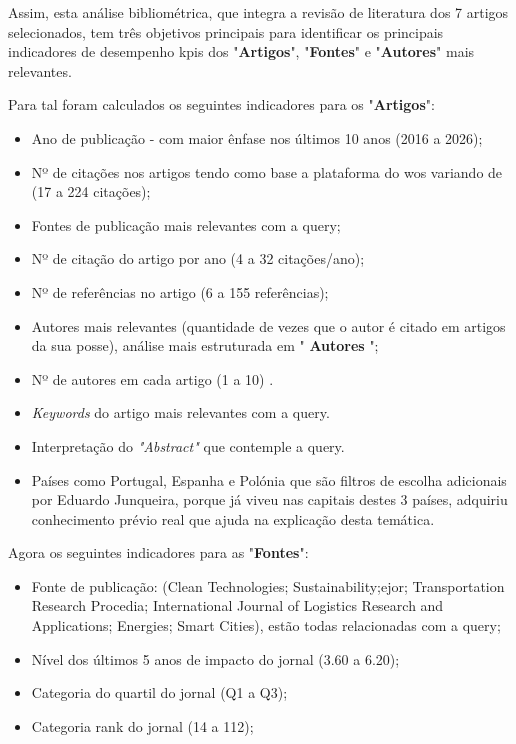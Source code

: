 Assim, esta análise bibliométrica, que integra a revisão de literatura dos 7 artigos selecionados, tem três objetivos principais para identificar os principais indicadores de desempenho \gls{kpi}s dos "\textbf{Artigos}", "\textbf{Fontes}" e "\textbf{Autores}" mais relevantes.

Para tal foram calculados os seguintes indicadores para os "\textbf{Artigos}":
\begin{itemize}
    \item Ano de publicação - com maior ênfase nos últimos 10 anos (2016 a 2026);
    \item Nº de citações nos artigos tendo como base a plataforma do \gls{wos} variando de (17 a 224 citações);
    \item Fontes de publicação mais relevantes com a \gls{query};
    \item Nº de citação do artigo por ano (4 a 32 citações/ano);
    \item Nº de referências no artigo (6 a 155 referências);
    \item Autores mais relevantes (quantidade de vezes que o autor é citado em artigos da sua posse), análise mais estruturada em "\textbf{ Autores }";
    \item Nº de autores em cada artigo (1 a 10) .
    \item \textit{Keywords} do artigo mais relevantes com a \gls{query}.
    \item Interpretação do \textit{"Abstract"} que contemple a \gls{query}.
    \item Países como Portugal, Espanha e Polónia que são filtros de escolha adicionais por Eduardo Junqueira, porque já viveu nas capitais destes 3 países, adquiriu conhecimento prévio real que ajuda na explicação desta temática. 
\end{itemize}

Agora os seguintes indicadores para as "\textbf{Fontes}":
\begin{itemize}
    \item Fonte de publicação: (Clean Technologies; Sustainability;\gls{ejor};
Transportation Research Procedia;
International Journal of Logistics Research and Applications;
Energies;
Smart Cities), estão todas relacionadas com a \gls{query};
    \item Nível dos últimos 5 anos de impacto do jornal (3.60 a 6.20);
    \item Categoria do quartil do jornal (Q1 a Q3);
    \item Categoria rank do jornal (14 a 112);
 \end{itemize}

